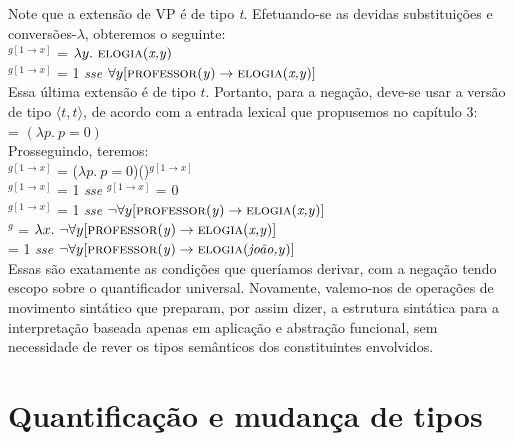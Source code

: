 \n Note que a extensão de VP é de tipo \textit{t}.
Efetuando-se as devidas substituições e conversões-$\lambda$,
obteremos o seguinte:\\

\n {}$^{g[1\rightarrow x]}$ = $\lambda y.\ \predica{elogia}{x,y}$\\

\n {}$^{g[1\rightarrow x]}$ = 1 \textit{sse} $\forall y [\text{\textsc{professor}(\textit{y})} \rightarrow \text{\textsc{elogia}(\textit{x,y})}]$\\

\n Essa última extensão é de tipo $t$. Portanto, para a negação,
deve-se usar a versão de tipo $\langle t,t\rangle$, de acordo com a
entrada lexical que propusemos no capítulo 3:\\

\n {} = $(\lambda p.\ p=0)$ \\

\n Prosseguindo, teremos:\\

\n {}$^{g[1\rightarrow x]}$ = ($\lambda p.\ p=0$)()$^{g[1\rightarrow x]}$\\

\n {}$^{g[1\rightarrow x]}$ = 1 \textit{sse} $^{g[1\rightarrow x]}$ = 0\\

\n {}$^{g[1\rightarrow x]}$ = 1 \textit{sse} $\neg\forall y [\text{\textsc{professor}(\textit{y})} \rightarrow \text{\textsc{elogia}(\textit{x,y})}]$\\

\n {}$^{g}$ = $\lambda x.\ \neg\forall y [\text{\textsc{professor}(\textit{y})} \rightarrow \text{\textsc{elogia}(\textit{x,y})}]$\\

\n {} = 1 \textit{sse} $\neg\forall y [\text{\textsc{professor}(\textit{y})} \rightarrow \text{\textsc{elogia}(\textit{joão,y})}]$\\

\n Essas são exatamente as condições que queríamos derivar, com a negação tendo escopo sobre o quantificador universal. Novamente, valemo-nos de operações de movimento sintático que preparam, por assim dizer, a estrutura sintática para a interpretação baseada apenas em aplicação e abstração funcional, sem necessidade de rever os tipos semânticos dos constituintes envolvidos.


\section{Quantificação e mudança de tipos}

